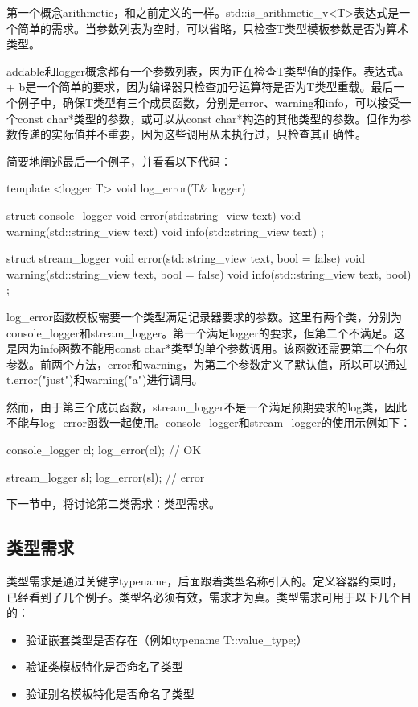 第一个概念arithmetic，和之前定义的一样。std::is\_arithmetic\_v<T>表达式是一个简单的需求。当参数列表为空时，可以省略，只检查T类型模板参数是否为算术类型。

addable和logger概念都有一个参数列表，因为正在检查T类型值的操作。表达式a + b是一个简单的要求，因为编译器只检查加号运算符是否为T类型重载。最后一个例子中，确保T类型有三个成员函数，分别是error、warning和info，可以接受一个const char*类型的参数，或可以从const char*构造的其他类型的参数。但作为参数传递的实际值并不重要，因为这些调用从未执行过，只检查其正确性。

简要地阐述最后一个例子，并看看以下代码：

\begin{cpp}
template <logger T>
void log_error(T& logger)
{}

struct console_logger
{
	void error(std::string_view text){}
	void warning(std::string_view text) {}
	void info(std::string_view text) {}
};

struct stream_logger
{
	void error(std::string_view text, bool = false) {}
	void warning(std::string_view text, bool = false) {}
	void info(std::string_view text, bool) {}
};
\end{cpp}

log\_error函数模板需要一个类型满足记录器要求的参数。这里有两个类，分别为console\_logger和stream\_logger。第一个满足logger的要求，但第二个不满足。这是因为info函数不能用const char*类型的单个参数调用。该函数还需要第二个布尔参数。前两个方法，error和warning，为第二个参数定义了默认值，所以可以通过t.error("just")和warning("a")进行调用。

然而，由于第三个成员函数，stream\_logger不是一个满足预期要求的log类，因此不能与log\_error函数一起使用。console\_logger和stream\_logger的使用示例如下：

\begin{cpp}
console_logger cl;
log_error(cl); // OK

stream_logger sl;
log_error(sl); // error
\end{cpp}

下一节中，将讨论第二类需求：类型需求。

\subsection{类型需求}

类型需求是通过关键字typename，后面跟着类型名称引入的。定义容器约束时，已经看到了几个例子。类型名必须有效，需求才为真。类型需求可用于以下几个目的：

\begin{itemize}
\item
验证嵌套类型是否存在（例如typename T::value\_type;）

\item
验证类模板特化是否命名了类型

\item
验证别名模板特化是否命名了类型
\end{itemize}

